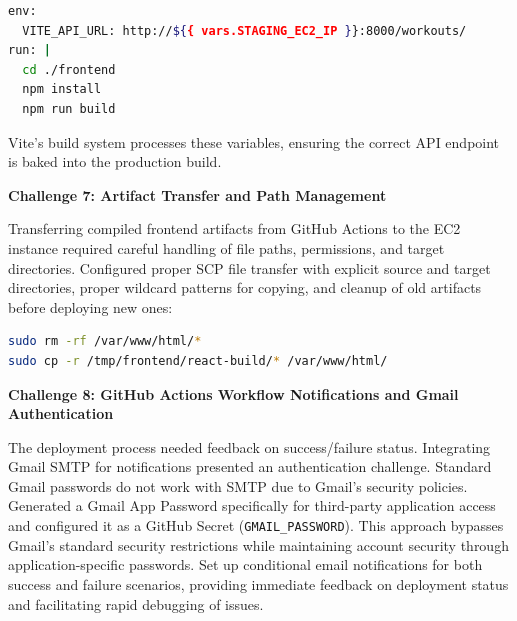 \documentclass{article}
\begin{document}
\begin{lstlisting}[language=bash, caption=Environment variable during build]
env:
  VITE_API_URL: http://${{ vars.STAGING_EC2_IP }}:8000/workouts/
run: |
  cd ./frontend
  npm install
  npm run build
\end{lstlisting}

Vite's build system processes these variables, ensuring the correct API endpoint is baked into the production build.

\vspace{0.3cm}

\textbf{Challenge 7: Artifact Transfer and Path Management}

Transferring compiled frontend artifacts from GitHub Actions to the EC2 instance required careful handling of file paths, permissions, and target directories. Configured proper SCP file transfer with explicit source and target directories, proper wildcard patterns for copying, and cleanup of old artifacts before deploying new ones:

\begin{lstlisting}[language=bash, caption=Frontend deployment]
sudo rm -rf /var/www/html/*
sudo cp -r /tmp/frontend/react-build/* /var/www/html/
\end{lstlisting}

\vspace{0.3cm}

\textbf{Challenge 8: GitHub Actions Workflow Notifications and Gmail Authentication}

The deployment process needed feedback on success/failure status. Integrating Gmail SMTP for notifications presented an authentication challenge. Standard Gmail passwords do not work with SMTP due to Gmail's security policies. Generated a Gmail App Password specifically for third-party application access and configured it as a GitHub Secret (\texttt{GMAIL\_PASSWORD}). This approach bypasses Gmail's standard security restrictions while maintaining account security through application-specific passwords. Set up conditional email notifications for both success and failure scenarios, providing immediate feedback on deployment status and facilitating rapid debugging of issues.
\end{document}
